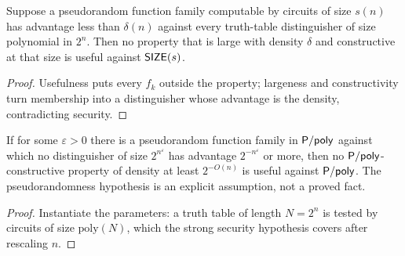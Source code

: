 \begin{theorem}
  \label{thm:barriers-razborov-rudich}
  \notready
  Suppose a pseudorandom function family computable by circuits of size
  $s(n)$ has advantage less than $\delta(n)$ against every truth-table
  distinguisher of size polynomial in $2^n$. Then no property that is large
  with density $\delta$ and constructive at that size is useful against
  $\mathsf{SIZE}(s)$.
\end{theorem}
\begin{proof}
  Usefulness puts every $f_k$ outside the property; largeness and
  constructivity turn membership into a distinguisher whose advantage is the
  density, contradicting security.
\end{proof}

\begin{corollary}
  \label{cor:barriers-natural-proofs}
  \notready
  If for some $\varepsilon > 0$ there is a pseudorandom function family in
  $\mathsf{P/poly}$ against which no distinguisher of size $2^{n^{\varepsilon}}$
  has advantage $2^{-n^{\varepsilon}}$ or more, then no
  $\mathsf{P/poly}$-constructive property of density at least $2^{-O(n)}$ is
  useful against $\mathsf{P/poly}$. The pseudorandomness hypothesis is an explicit
  assumption, not a proved fact.
\end{corollary}
\begin{proof}
  Instantiate the parameters: a truth table of length $N = 2^n$ is tested by
  circuits of size $\mathrm{poly}(N)$, which the strong security hypothesis
  covers after rescaling $n$.
\end{proof}
